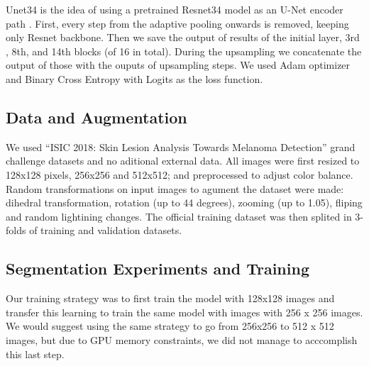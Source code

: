 \documentclass[conference]{IEEEtran}
\begin{document}
Unet34 is the idea of using a pretrained Resnet34 model as an U-Net encoder path \cite{fastai}. First, every step from the adaptive pooling onwards is removed, keeping only Resnet backbone. Then we save the output of results of the initial layer, 3rd , 8th, and 14th blocks (of 16 in total). During the upsampling we concatenate the output of those with the ouputs of upsampling steps. We used Adam optimizer and Binary Cross Entropy with Logits as the loss function.

\subsection{Data and Augmentation}
We used “ISIC 2018: Skin Lesion Analysis Towards Melanoma Detection” grand challenge datasets \cite{codella, ham} and no aditional external data. All images were first resized to 128x128 pixels, 256x256 and 512x512; and preprocessed to adjust color balance. Random transformations on input images to agument the dataset were made: dihedral transformation, rotation (up to 44 degrees), zooming (up to 1.05), fliping and random lightining changes. The official training dataset was then splited in 3-folds of training and validation datasets.  


\subsection{Segmentation Experiments and Training}
\label{sec:seg_training}
Our training strategy was to first train the model with 128x128 images and transfer this learning to train the same model with images with 256 x 256 images. We would suggest using the same strategy to go from 256x256 to 512 x 512 images, but due to GPU memory constraints, we did not manage to acccomplish this last step.
\end{document}

